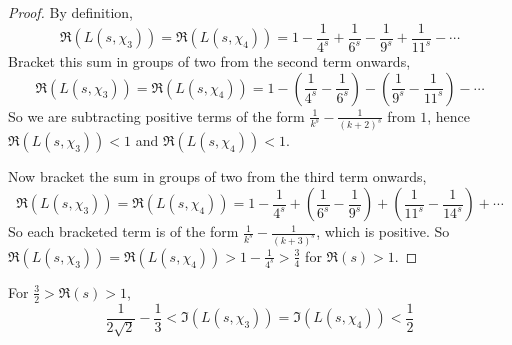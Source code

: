 \documentclass{unswmaths}
\begin{document}
    \begin{proof}
        By definition,
        \begin{equation*}
            \Re(L(s,\chi_3)) = \Re(L(s,\chi_4)) = 1-\frac{1}{4^s}+\frac{1}{6^s}-\frac{1}{9^s}+\frac{1}{11^s}-\cdots
        \end{equation*}
        Bracket this sum in groups of two from the second term onwards,
        \begin{equation*}
            \Re(L(s,\chi_3)) = \Re(L(s,\chi_4)) = 1-(\frac{1}{4^s}-\frac{1}{6^s})-(\frac{1}{9^s}-\frac{1}{11^s})-\cdots
        \end{equation*}
        So we are subtracting positive terms of the form $\frac{1}{k^s}-\frac{1}{(k+2)^s}$ from $1$, hence $\Re(L(s,\chi_3)) < 1$
        and $\Re(L(s,\chi_4)) < 1$.
        
        Now bracket the sum in groups of two from the third term onwards,     
        \begin{equation*}
            \Re(L(s,\chi_3)) = \Re(L(s,\chi_4)) = 1-\frac{1}{4^s}+\left(\frac{1}{6^s}-\frac{1}{9^s}\right)+\left(\frac{1}{11^s}-\frac{1}{14^s}\right)+\cdots
        \end{equation*}
        So each bracketed term is of the form $\frac{1}{k^s}-\frac{1}{(k+3)^s}$, which is positive. So $\Re(L(s,\chi_3)) = \Re(L(s,\chi_4)) > 1-\frac{1}{4^s} > \frac{3}{4}$
        for $\Re(s) > 1$.
    \end{proof}
    \begin{lemma}
        For $\frac{3}{2} > \Re(s) > 1$, 
        \begin{equation*}
            \frac{1}{2\sqrt{2}}-\frac{1}{3} < \Im(L(s,\chi_3)) = \Im(L(s,\chi_4)) < \frac{1}{2}
        \end{equation*}
    \end{lemma}
\end{document}
